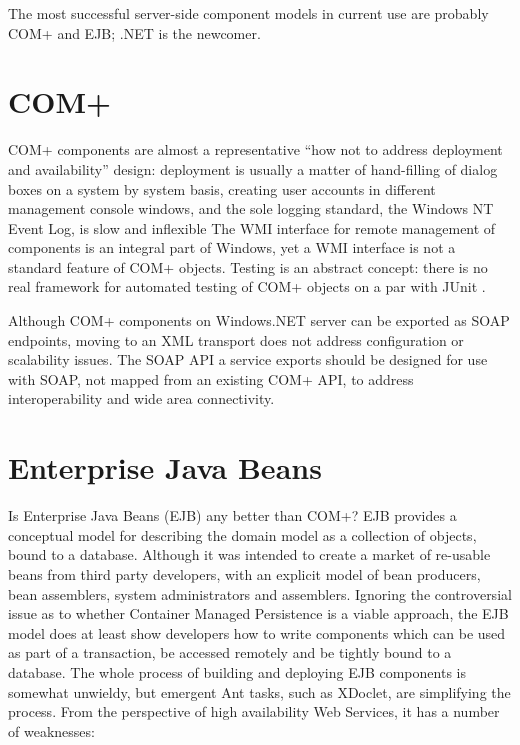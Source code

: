 \documentclass[draft]{report}
\begin{document}
The most successful server-side component models in current use are
probably COM+ and EJB; .NET is the newcomer.

\section{COM+}

COM+ components are almost a representative ``how not to address
deployment and availability'' design: deployment is usually a matter of
hand-filling of dialog boxes on a system by system basis, creating user
accounts in different management console windows, and the sole logging
standard, the Windows NT Event Log, is slow and inflexible The WMI
interface for remote management of components is an integral part of
Windows, yet a WMI interface is not a standard feature of COM+ objects.
Testing is an abstract concept: there is no real framework for automated
testing of COM+ objects on a par with JUnit \cite{app:junit}.

Although COM+ components on Windows.NET server can be exported as SOAP
endpoints, moving to an XML transport does not address configuration or
scalability issues. The SOAP API a service exports should be designed
for use with SOAP, not mapped from an existing COM+ API, to address
interoperability and wide area connectivity.

\section{Enterprise Java Beans}

Is Enterprise Java Beans (EJB) any better than COM+? EJB provides a
conceptual model for describing the domain model as a collection of
objects, bound to a database. Although it was intended to create a
market of re-usable beans from third party developers, with an explicit
model of bean producers, bean assemblers, system administrators and
assemblers. Ignoring the controversial issue as to whether Container
Managed Persistence is a viable approach, the EJB model does at least
show developers how to write components which can be used as part of a
transaction, be accessed remotely and be tightly bound to a database.
The whole process of building and deploying EJB components is somewhat
unwieldy, but emergent Ant tasks, such as XDoclet, are simplifying the
process. From the perspective of high availability Web Services, it has
a number of weaknesses:
\end{document}
